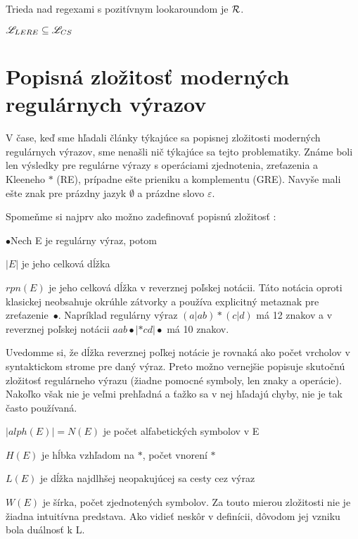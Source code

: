 \begin{veta}[Veta 2.2.10.]\label{lookaround+R}
Trieda nad regexami s pozitívnym lookaroundom je ${\cal R}$.
\end{veta} 

\begin{veta}[Veta 2.2.14.]\label{le+lcs}
$ \mathscr{L}_{LERE} \subseteq \mathscr{L}_{CS} $
\end{veta}

\section[Popisná zložitosť]{Popisná zložitosť moderných regulárnych výrazov}
\label{uzlozitost}

V čase, keď sme hľadali články týkajúce sa popisnej zložitosti moderných regulárnych výrazov, sme nenašli nič týkajúce sa tejto problematiky. Známe boli len výsledky pre regulárne výrazy s operáciami zjednotenia, zreťazenia a Kleeneho $*$ (RE), prípadne ešte prieniku a komplementu (GRE). Navyše mali ešte znak pre prázdny jazyk $\emptyset$ a prázdne slovo $\varepsilon$.

Spomeňme si najprv ako možno zadefinovať popisnú zložitosť \cite{newResults} \cite{compMeasures75}:

\begin{list}{$\bullet$}{Nech E je regulárny výraz, potom}
\item $|E|$ je jeho celková dĺžka
\item $rpn(E)$ je jeho celková dĺžka v reverznej poľskej notácii. Táto notácia oproti klasickej neobsahuje okrúhle zátvorky a používa explicitný metaznak pre zreťazenie~$\bullet$. Napríklad regulárny výraz $(a|ab)*(c|d)$ má 12 znakov a v reverznej poľskej notácii $aab\bullet |*cd|\bullet$ má 10 znakov.

Uvedomme si, že dĺžka reverznej poľkej notácie je rovnaká ako počet vrcholov v syntaktickom strome pre daný výraz. Preto možno vernejšie popisuje skutočnú zložitosť regulárneho výrazu (žiadne pomocné symboly, len znaky a operácie). Nakoľko však nie je veľmi prehľadná a ťažko sa v nej hľadajú chyby, nie je tak často používaná.
\item $|alph(E)|= N(E)$ je počet alfabetických symbolov v E
\item $H(E)$ je hĺbka vzhľadom na $*$, počet vnorení $*$
\item $L(E)$ je dĺžka najdlhšej neopakujúcej sa cesty cez výraz
\item $W(E)$ je šírka, počet zjednotených symbolov. Za touto mierou zložitosti nie je žiadna intuitívna predstava. Ako vidieť neskôr v definícii, dôvodom jej vzniku bola duálnosť k L.
\end{list}

